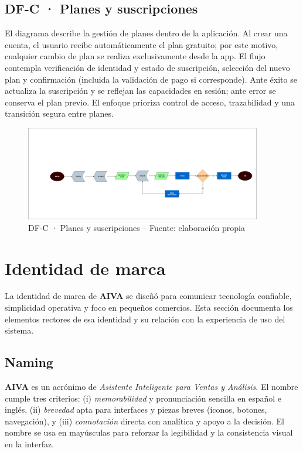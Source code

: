 \subsection{DF-C · Planes y suscripciones}
El diagrama describe la gestión de planes dentro de la aplicación. Al crear una cuenta, el usuario recibe automáticamente el plan gratuito; por este motivo, cualquier cambio de plan se realiza exclusivamente desde la app. El flujo contempla verificación de identidad y estado de suscripción, selección del nuevo plan y confirmación (incluida la validación de pago si corresponde). Ante éxito se actualiza la suscripción y se reflejan las capacidades en sesión; ante error se conserva el plan previo. El enfoque prioriza control de acceso, trazabilidad y una transición segura entre planes.

\begin{figure}[!htbp]
  \centering
  \includegraphics[width=0.92\textwidth]{images/FlujoPlanes.drawio.png}
  \caption{DF-C · Planes y suscripciones -- Fuente: elaboración propia}
  \label{fig:df-c-planes}
\end{figure}


\vspace{1cm}
\section{Identidad de marca}\label{sec:brand}

La identidad de marca de \textbf{AIVA} se diseñó para comunicar tecnología confiable, simplicidad operativa y foco en pequeños comercios. Esta sección documenta los elementos rectores de esa identidad y su relación con la experiencia de uso del sistema.

\subsection{Naming}
\textbf{AIVA} es un acrónimo de \textit{Asistente Inteligente para Ventas y Análisis}. El nombre cumple tres criterios: (i) \textit{memorabilidad} y pronunciación sencilla en español e inglés, (ii) \textit{brevedad} apta para interfaces y piezas breves (íconos, botones, navegación), y (iii) \textit{connotación} directa con analítica y apoyo a la decisión. El nombre se usa en mayúsculas para reforzar la legibilidad y la consistencia visual en la interfaz.

